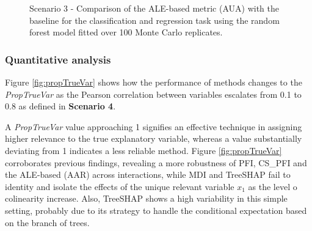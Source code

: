 \begin{figure}[ht!]
\centering
  \caption{Scenario 3 - Comparison of the ALE-based metric (AUA) with the baseline for the classification and regression task using the random forest model fitted over 100 Monte Carlo replicates.}
    \label{fig:scenario3}
\end{figure}

\subsubsection{Quantitative analysis}

Figure \ref{fig:propTrueVar} shows how the performance of methods changes to the \textit{PropTrueVar} as the Pearson correlation between variables escalates from 0.1 to 0.8 as defined in \textbf{Scenario 4}.

A \textit{PropTrueVar} value approaching 1 signifies an effective technique in assigning higher relevance to the true explanatory variable, whereas a value substantially deviating from 1 indicates a less reliable method. Figure \ref{fig:propTrueVar} corroborates previous findings, revealing a more robustness of PFI, CS\_PFI and the ALE-based (AAR) across interactions, while MDI and TreeSHAP fail to identity and isolate the effects of the unique relevant variable \(x_1\) as the level o colinearity increase. Also, TreeSHAP shows a high variability in this simple setting, probably due to its strategy to handle the conditional expectation based on the branch of trees. 

